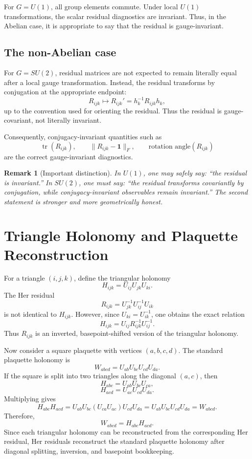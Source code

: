 \documentclass[11pt]{article}
\newtheorem{remark}{Remark}
\newcommand{\Id}{\mathbf{1}}
\newcommand{\Uone}{U(1)}
\newcommand{\Sutwo}{SU(2)}
\newcommand{\Rijk}{R_{ijk}}
\newcommand{\Hijk}{H_{ijk}}
\newcommand{\Wij}{W_{abcd}}
\newcommand{\tr}{\operatorname{tr}}
\begin{document}
For \(G=\Uone\), all group elements commute.  Under local \(\Uone\) transformations, the scalar residual diagnostics are invariant.  Thus, in the Abelian case, it is appropriate to say that the residual is gauge-invariant.

\subsection{The non-Abelian case}

For \(G=\Sutwo\), residual matrices are not expected to remain literally equal after a local gauge transformation.  Instead, the residual transforms by conjugation at the appropriate endpoint:
\[
\Rijk \mapsto \Rijk' = h_k^{-1}\Rijk h_k,
\]
up to the convention used for orienting the residual.  Thus the residual is gauge-covariant, not literally invariant.

Consequently, conjugacy-invariant quantities such as
\[
\tr(\Rijk),\qquad \|\Rijk-\Id\|_F,\qquad \text{rotation angle}(\Rijk)
\]
are the correct gauge-invariant diagnostics.

\begin{remark}[Important distinction]
In \(\Uone\), one may safely say: ``the residual is invariant.''  In \(\Sutwo\), one must say: ``the residual transforms covariantly by conjugation, while conjugacy-invariant observables remain invariant.''  The second statement is stronger and more geometrically honest.
\end{remark}

\section{Triangle Holonomy and Plaquette Reconstruction}

For a triangle \((i,j,k)\), define the triangular holonomy
\[
\Hijk=U_{ij}U_{jk}U_{ki}.
\]
The Her residual
\[
\Rijk=U_{jk}^{-1}U_{ij}^{-1}U_{ik}
\]
is not identical to \(\Hijk\).  However, since \(U_{ki}=U_{ik}^{-1}\), one obtains the exact relation
\[
\Hijk = U_{ij}\Rijk^{-1}U_{ij}^{-1}.
\]
Thus \(\Rijk\) is an inverted, basepoint-shifted version of the triangular holonomy.

Now consider a square plaquette with vertices \((a,b,c,d)\).  The standard plaquette holonomy is
\[
\Wij=U_{ab}U_{bc}U_{cd}U_{da}.
\]
If the square is split into two triangles along the diagonal \((a,c)\), then
\[
H_{abc}=U_{ab}U_{bc}U_{ca},
\]
\[
H_{acd}=U_{ac}U_{cd}U_{da}.
\]
Multiplying gives
\[
H_{abc}H_{acd}=U_{ab}U_{bc}(U_{ca}U_{ac})U_{cd}U_{da}
=U_{ab}U_{bc}U_{cd}U_{da}
=\Wij.
\]
Therefore,
\[
\boxed{\Wij=H_{abc}H_{acd}.}
\]
Since each triangular holonomy can be reconstructed from the corresponding Her residual, Her residuals reconstruct the standard plaquette holonomy after diagonal splitting, inversion, and basepoint bookkeeping.
\end{document}
